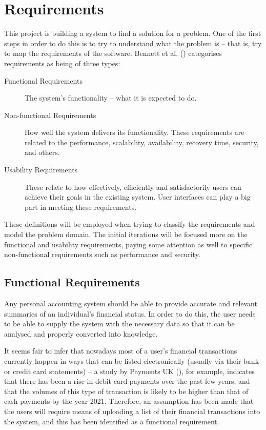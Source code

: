 \section{Requirements} \label{sec:Requirements}
This project is building a system to find a solution for a problem. One of the
first steps in order to do this is to try to understand what the problem is --
that is, try to map the requirements of the software. Bennett et al.
(\citeyear[][pp.~140-142]{bennett2010object}) categorises requirements as being
of three types:

\begin{description} \item[Functional Requirements]
    The system's functionality -- what it is expected to do.
    
  \item[Non-functional Requirements]
    How well the system delivers its functionality. These requirements are
    related to the performance, scalability, availability, recovery time,
    security, and others.

  \item[Usability Requirements]
    These relate to how effectively, efficiently and satisfactorily users can
    achieve their goals in the existing system. User interfaces can play a big
    part in meeting these requirements.
\end{description}

These definitions will be employed when trying to classify the requirements and
model the problem domain. The initial iterations will be focused more on the
functional and usability requirements, paying some attention as well to
specific non-functional requirements such as performance and security.

\subsection{Functional Requirements} \label{sec:Requirements.FunctionalRequirements}
Any personal accounting system should be able to provide accurate and relevant
summaries of an individual's financial status. In order to do this, the user
needs to be able to supply the system with the necessary data so that it can be
analysed and properly converted into knowledge.

It seems fair to infer that nowadays most of a user's financial transactions
currently happen in ways that can be listed electronically (usually via their
bank or credit card statements) -- a study by Payments UK
(\citeyear{paymentsUK2017summary}), for example, indicates that there has been
a rise in debit card payments over the past few years, and that the volumes of
this type of transaction is likely to be higher than that of cash payments by
the year 2021. Therefore, an assumption has been made that the users will
require means of uploading a list of their financial transactions into the
system, and this has been identified as a functional requirement.

